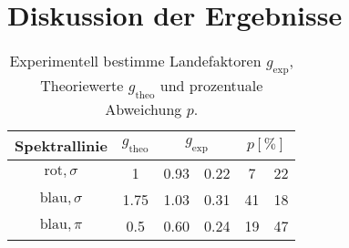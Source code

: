 \section{Diskussion der Ergebnisse}
\label{sec:Diskussion}

\begin{table}[H]
    \centering
      \caption{Experimentell bestimme Landefaktoren $g_\text{exp}$, Theoriewerte $g_\text{theo}$ und prozentuale Abweichung $p$.}
      \label{tab:p}
      \begin{tabular}{c S S @{${}\pm{}$} S S[table-format=2.0]  @{${}\pm{}$} S[table-format=2.0] }
        \toprule
        {Spektrallinie} & {$g_\text{theo}$} &  & \\
        \midrule
        $\text{rot},\sigma$  & 1    &  0.93 & 0.22 & 7  & 22 \\
        $\text{blau},\sigma$ & 1.75 &  1.03 & 0.31 & 41 & 18 \\
        $\text{blau},\pi$    & 0.5  &  0.60 & 0.24 & 19 & 47 \\
        \bottomrule
      \end{tabular}
\end{table}
\noindent
